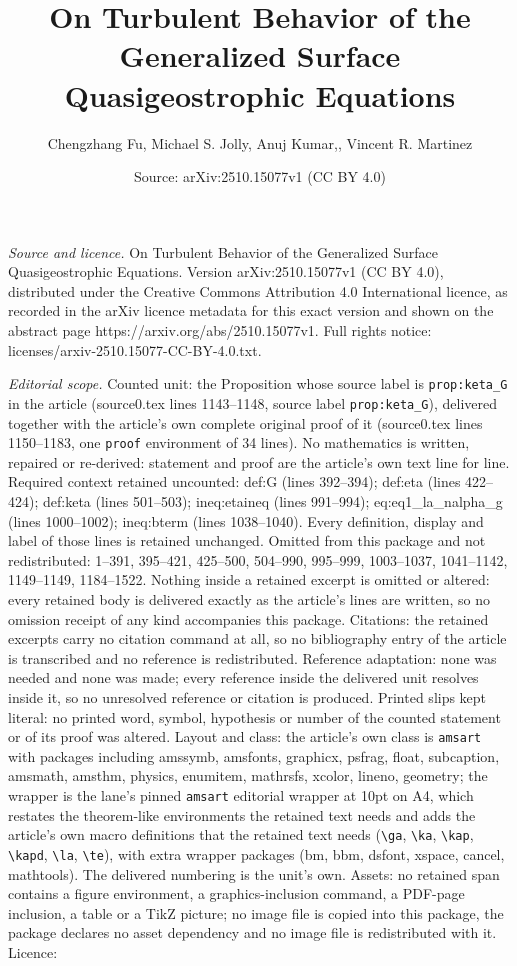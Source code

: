 \documentclass[10pt,a4paper]{amsart}
\title[On Turbulent Behavior of the Generalized Surface Quasigeostr]{On Turbulent Behavior of the Generalized Surface Quasigeostrophic Equations}
\author{Chengzhang Fu, Michael S. Jolly, Anuj Kumar,, Vincent R. Martinez}
\date{Source: arXiv:2510.15077v1 (CC BY 4.0)}
\begin{document}
\maketitle

\noindent\emph{Source and licence.} On Turbulent Behavior of the Generalized Surface Quasigeostrophic Equations. Version arXiv:2510.15077v1 (CC BY 4.0), distributed under the Creative Commons Attribution 4.0 International licence, as recorded in the arXiv licence metadata for this exact version and shown on the abstract page https://arxiv.org/abs/2510.15077v1. Full rights notice: licenses/arxiv-2510.15077-CC-BY-4.0.txt.\par\smallskip

\noindent\textit{Editorial scope.} Counted unit: the Proposition whose source label is \texttt{prop:keta\_G} in the article (source0.tex lines 1143--1148, source label \texttt{prop:keta\_G}), delivered together with the article's own complete original proof of it (source0.tex lines 1150--1183, one \texttt{proof} environment of 34 lines). No mathematics is written, repaired or re-derived: statement and proof are the article's own text line for line. Required context retained uncounted: def:G (lines 392--394); def:eta (lines 422--424); def:keta (lines 501--503); ineq:etaineq (lines 991--994); eq:eq1\_la\_nalpha\_g (lines 1000--1002); ineq:bterm (lines 1038--1040). Every definition, display and label of those lines is retained unchanged. Omitted from this package and not redistributed: 1--391, 395--421, 425--500, 504--990, 995--999, 1003--1037, 1041--1142, 1149--1149, 1184--1522. Nothing inside a retained excerpt is omitted or altered: every retained body is delivered exactly as the article's lines are written, so no omission receipt of any kind accompanies this package. Citations: the retained excerpts carry no citation command at all, so no bibliography entry of the article is transcribed and no reference is redistributed. Reference adaptation: none was needed and none was made; every reference inside the delivered unit resolves inside it, so no unresolved reference or citation is produced. Printed slips kept literal: no printed word, symbol, hypothesis or number of the counted statement or of its proof was altered. Layout and class: the article's own class is \texttt{amsart} with packages including amssymb, amsfonts, graphicx, psfrag, float, subcaption, amsmath, amsthm, physics, enumitem, mathrsfs, xcolor, lineno, geometry; the wrapper is the lane's pinned \texttt{amsart} editorial wrapper at 10pt on A4, which restates the theorem-like environments the retained text needs and adds the article's own macro definitions that the retained text needs (\texttt{\textbackslash ga}, \texttt{\textbackslash ka}, \texttt{\textbackslash kap}, \texttt{\textbackslash kapd}, \texttt{\textbackslash la}, \texttt{\textbackslash te}), with extra wrapper packages (bm, bbm, dsfont, xspace, cancel, mathtools). The delivered numbering is the unit's own. Assets: no retained span contains a figure environment, a graphics-inclusion command, a PDF-page inclusion, a table or a TikZ picture; no image file is copied into this package, the package declares no asset dependency and no image file is redistributed with it. Licence: 
\end{document}
